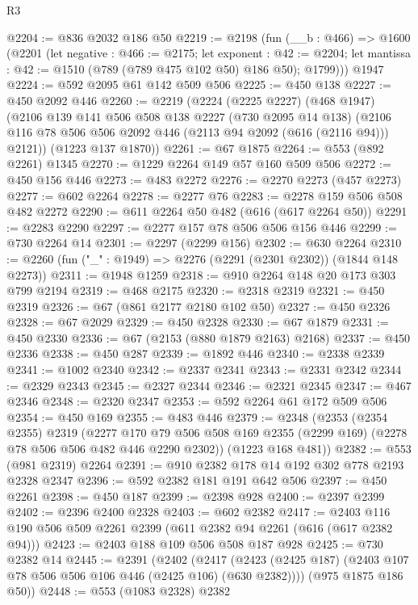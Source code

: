 \begin{lexlean}{R3}
\begin{coremodule}
@2204 := @836 @2032 @186 @50
@2219 := @2198
    (fun (__b : @466) =>
    @1600
      (@2201
        (let negative : @466 := @2175;
        let exponent : @42 := @2204;
        let mantissa : @42 := @1510 (@789 (@789 @475 @102 @50) @186 @50); @1799)))
    @1947
@2224 := @592 @2095 @61 @142 @509 @506
@2225 := @450 @138
@2227 := @450 @2092 @446
@2260 := @2219
    (@2224
      (@2225 @2227)
      (@468 @1947)
      (@2106
        @139
        @141
        @506
        @508
        @138
        @2227
        (@730 @2095 @14 @138)
        (@2106 @116 @78 @506 @506 @2092 @446 (@2113 @94 @2092 (@616 (@2116 @94))) @2121))
      (@1223 @137 @1870))
@2261 := @67 @1875
@2264 := @553 (@892 @2261) @1345
@2270 := @1229 @2264 @149 @57 @160 @509 @506
@2272 := @450 @156 @446
@2273 := @483 @2272
@2276 := @2270 @2273 (@457 @2273)
@2277 := @602 @2264
@2278 := @2277 @76
@2283 := @2278 @159 @506 @508 @482 @2272
@2290 := @611 @2264 @50 @482 (@616 (@617 @2264 @50))
@2291 := @2283 @2290
@2297 := @2277 @157 @78 @506 @506 @156 @446
@2299 := @730 @2264 @14
@2301 := @2297 (@2299 @156)
@2302 := @630 @2264
@2310 := @2260 (fun ("_" : @1949) => @2276 (@2291 (@2301 @2302)) (@1844 @148 @2273))
@2311 := @1948 @1259
@2318 := @910 @2264 @148 @20 @173 @303 @799 @2194
@2319 := @468 @2175
@2320 := @2318 @2319
@2321 := @450 @2319
@2326 := @67 (@861 @2177 @2180 @102 @50)
@2327 := @450 @2326
@2328 := @67 @2029
@2329 := @450 @2328
@2330 := @67 @1879
@2331 := @450 @2330
@2336 := @67 (@2153 (@880 @1879 @2163) @2168)
@2337 := @450 @2336
@2338 := @450 @287
@2339 := @1892 @446
@2340 := @2338 @2339
@2341 := @1002 @2340
@2342 := @2337 @2341
@2343 := @2331 @2342
@2344 := @2329 @2343
@2345 := @2327 @2344
@2346 := @2321 @2345
@2347 := @467 @2346
@2348 := @2320 @2347
@2353 := @592 @2264 @61 @172 @509 @506
@2354 := @450 @169
@2355 := @483 @446
@2379 := @2348
    (@2353
      (@2354 @2355)
      @2319
      (@2277 @170 @79 @506 @508 @169 @2355 (@2299 @169) (@2278 @78 @506 @506 @482 @446 @2290 @2302))
      (@1223 @168 @481))
@2382 := @553 (@981 @2319) @2264
@2391 := @910 @2382 @178 @14 @192 @302 @778 @2193 @2328 @2347
@2396 := @592 @2382 @181 @191 @642 @506
@2397 := @450 @2261
@2398 := @450 @187
@2399 := @2398 @928
@2400 := @2397 @2399
@2402 := @2396 @2400 @2328
@2403 := @602 @2382
@2417 := @2403 @116 @190 @506 @509 @2261 @2399 (@611 @2382 @94 @2261 (@616 (@617 @2382 @94)))
@2423 := @2403 @188 @109 @506 @508 @187 @928
@2425 := @730 @2382 @14
@2445 := @2391
    (@2402
      (@2417 (@2423 (@2425 @187) (@2403 @107 @78 @506 @506 @106 @446 (@2425 @106) (@630 @2382))))
      (@975 @1875 @186 @50))
@2448 := @553 (@1083 @2328) @2382

\end{coremodule}
\end{lexlean}
